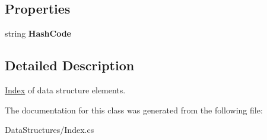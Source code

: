 \subsection*{Properties}
\begin{DoxyCompactItemize}
\item 
\hypertarget{class_dwarf_d_b_1_1_data_structures_1_1_index_a610b62ec24e0fad773071dc6242eccfd}{
string {\bfseries HashCode}}
\label{class_dwarf_d_b_1_1_data_structures_1_1_index_a610b62ec24e0fad773071dc6242eccfd}

\end{DoxyCompactItemize}


\subsection{Detailed Description}
\hyperlink{class_dwarf_d_b_1_1_data_structures_1_1_index}{Index} of data structure elements. 

The documentation for this class was generated from the following file:\begin{DoxyCompactItemize}
\item 
DataStructures/Index.cs\end{DoxyCompactItemize}
